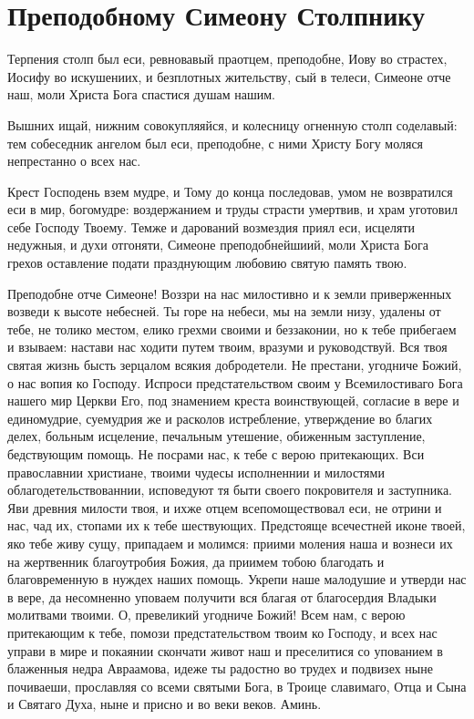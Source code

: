 \section{Преподобному Симеону Столпнику}\begin{mymulticols}


Терпения столп был еси, ревновавый праотцем, преподобне, Иову во страстех, Иосифу во искушениих, и безплотных жительству, сый в телеси, Симеоне отче наш, моли Христа Бога спастися душам нашим. 


Вышних ищай, нижним совокупляяйся, и колесницу огненную столп соделавый: тем собеседник ангелом был еси, преподобне, с ними Христу Богу моляся непрестанно о всех нас.


Крест Господень взем мудре, и Тому до конца последовав, умом не возвратился еси в мир, богомудре: воздержанием и труды страсти умертвив, и храм уготовил себе Господу Твоему. Темже и дарований возмездия приял еси, исцеляти недужныя, и духи отгоняти, Симеоне преподобнейшиий, моли Христа Бога грехов оставление подати празднующим любовию святую память твою.


Преподобне отче Симеоне! Воззри на нас милостивно и к земли приверженных возведи к высоте небесней. Ты горе на небеси, мы на земли низу, удалены от тебе, не толико местом, елико грехми своими и беззаконии, но к тебе прибегаем и взываем: настави нас ходити путем твоим, вразуми и руководствуй. Вся твоя святая жизнь бысть зерцалом всякия добродетели. Не престани, угодниче Божий, о нас вопия ко Господу. Испроси предстательством своим у Всемилостиваго Бога нашего мир Церкви Его, под знамением креста воинствующей, согласие в вере и единомудрие, суемудрия же и расколов истребление, утверждение во благих делех, больным исцеление, печальным утешение, обиженным заступление, бедствующим помощь. Не посрами нас, к тебе с верою притекающих. Вси православнии христиане, твоими чудесы исполненнии и милостями облагодетельствованнии, исповедуют тя быти своего покровителя и заступника. Яви древния милости твоя, и ихже отцем всепомоществовал еси, не отрини и нас, чад их, стопами их к тебе шествующих. Предстояще всечестней иконе твоей, яко тебе живу сущу, припадаем и молимся: приими моления наша и вознеси их на жертвенник благоутробия Божия, да приимем тобою благодать и благовременную в нуждех наших помощь. Укрепи наше малодушие и утверди нас в вере, да несомненно уповаем получити вся благая от благосердия Владыки молитвами твоими. О, превеликий угодниче Божий! Всем нам, с верою притекающим к тебе, помози предстательством твоим ко Господу, и всех нас управи в мире и покаянии скончати живот наш и преселитися со упованием в блаженныя недра Авраамова, идеже ты радостно во трудех и подвизех ныне почиваеши, прославляя со всеми святыми Бога, в Троице славимаго, Отца и Сына и Святаго Духа, ныне и присно и во веки веков. Аминь.

\end{mymulticols}

